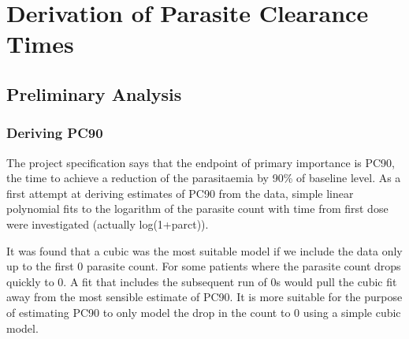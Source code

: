\chapter{Derivation of Parasite Clearance Times}
\section{Preliminary Analysis}
\subsection{Deriving PC90}
The project specification says that the endpoint of primary importance is PC90, the time to achieve a reduction of the parasitaemia by 90\% of baseline level. As a first attempt at deriving estimates of PC90 from the data, simple linear polynomial fits to the logarithm of the parasite count with time from first dose were investigated (actually log(1+parct)).

It was found that a cubic was the most suitable model if we include the data only up to the first 0 parasite count. For some patients where the parasite count drops quickly to 0. A fit that includes the subsequent run of 0s would pull the cubic fit away from the most sensible estimate of PC90. It is more suitable for the purpose of estimating PC90 to only model the drop in the count to 0 using a simple cubic model. 


